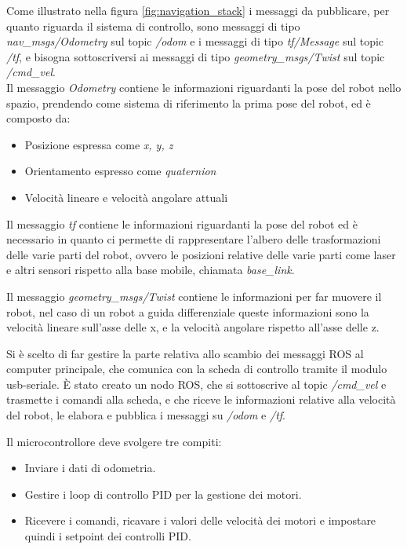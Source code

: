\newpage
Come illustrato nella figura \ref{fig:navigation_stack} i messaggi da pubblicare, per quanto riguarda il sistema di controllo, sono messaggi di tipo \textit{nav\_msgs/Odometry} sul topic \textit{/odom} e i messaggi di tipo \textit{tf/Message} sul topic \textit{/tf}, e bisogna sottoscriversi ai messaggi di tipo \textit{geometry\_msgs/Twist} sul topic \textit{/cmd\_vel}. \\
Il messaggio \textit{Odometry} contiene le informazioni riguardanti la pose del robot nello spazio, prendendo come sistema di riferimento la prima pose del robot, ed è composto da:
\begin{itemize}
    \item Posizione espressa come \textit{x, y, z}
    \item Orientamento espresso come \textit{quaternion}
    \item Velocità lineare e velocità angolare attuali
\end{itemize}

Il messaggio \textit{tf} contiene le informazioni riguardanti la pose del robot ed è necessario in quanto ci permette di rappresentare l'albero delle trasformazioni delle varie parti del robot, ovvero le posizioni relative delle varie parti come laser e altri sensori rispetto alla base mobile, chiamata \textit{base\_link}.

Il messaggio \textit{geometry\_msgs/Twist} contiene le informazioni per far muovere il robot, nel caso di un robot a guida differenziale queste informazioni sono la velocità lineare sull'asse delle x, e la velocità angolare rispetto all'asse delle z.

Si è scelto di far gestire la parte relativa allo scambio dei messaggi ROS al computer principale, che comunica con la scheda di controllo tramite il modulo usb-seriale. 
È stato creato un nodo ROS, che si sottoscrive al topic \textit{/cmd\_vel} e trasmette i comandi alla scheda, e che riceve le informazioni relative alla velocità del robot, le elabora e pubblica i messaggi su \textit{/odom} e \textit{/tf}.

Il microcontrollore deve svolgere tre compiti: 
\begin{itemize}
    \item Inviare i dati di odometria.
    \item Gestire i loop di controllo PID per la gestione dei motori.
    \item Ricevere i comandi, ricavare i valori delle velocità dei motori e impostare quindi i setpoint dei controlli PID.
\end{itemize}

